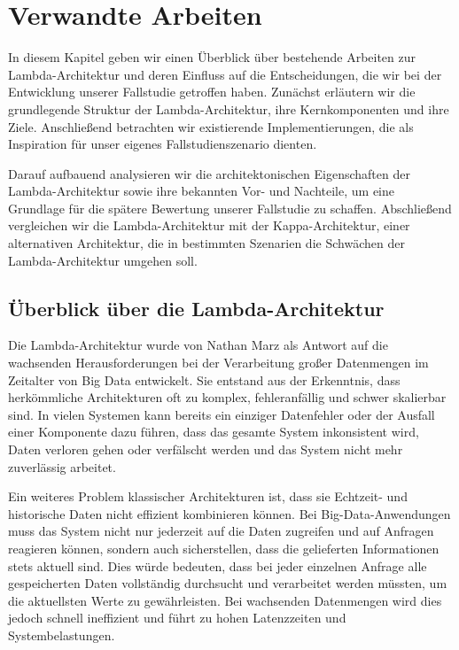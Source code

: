 \chapter{Verwandte Arbeiten}
In diesem Kapitel geben wir einen Überblick über bestehende Arbeiten zur Lambda-Architektur und deren Einfluss auf die Entscheidungen, die wir bei der Entwicklung unserer Fallstudie getroffen haben. Zunächst erläutern wir die grundlegende Struktur der Lambda-Architektur, ihre Kernkomponenten und ihre Ziele. Anschließend betrachten wir existierende Implementierungen, die als Inspiration für unser eigenes Fallstudienszenario dienten.

Darauf aufbauend analysieren wir die architektonischen Eigenschaften der Lambda-Architektur sowie ihre bekannten Vor- und Nachteile, um eine Grundlage für die spätere Bewertung unserer Fallstudie zu schaffen. Abschließend vergleichen wir die Lambda-Architektur mit der Kappa-Architektur, einer alternativen Architektur, die in bestimmten Szenarien die Schwächen der Lambda-Architektur umgehen soll.

\section{Überblick über die Lambda-Architektur}
Die Lambda-Architektur wurde von Nathan Marz \cite{warren2015big} als Antwort auf die wachsenden Herausforderungen bei der Verarbeitung großer Datenmengen im Zeitalter von Big Data entwickelt. Sie entstand aus der Erkenntnis, dass herkömmliche Architekturen oft zu komplex, fehleranfällig und schwer skalierbar sind. In vielen Systemen kann bereits ein einziger Datenfehler oder der Ausfall einer Komponente dazu führen, dass das gesamte System inkonsistent wird, Daten verloren gehen oder verfälscht werden und das System nicht mehr zuverlässig arbeitet.

Ein weiteres Problem klassischer Architekturen ist, dass sie Echtzeit- und historische Daten nicht effizient kombinieren können.
Bei Big-Data-Anwendungen muss das System nicht nur jederzeit auf die Daten zugreifen und auf Anfragen reagieren können, sondern auch sicherstellen, dass die gelieferten Informationen stets aktuell sind. Dies würde bedeuten, dass bei jeder einzelnen Anfrage alle gespeicherten Daten vollständig durchsucht und verarbeitet werden müssten, um die aktuellsten Werte zu gewährleisten. Bei wachsenden Datenmengen wird dies jedoch schnell ineffizient und führt zu hohen Latenzzeiten und Systembelastungen.

